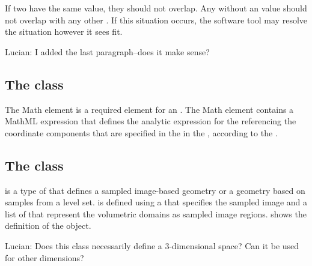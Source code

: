 If two \AnalyticVolumes have the same  value, they should not overlap.  Any \AnalyticVolume without an  value should not overlap with any other \AnalyticVolume.  If this situation occurs, the software tool may resolve the situation however it sees fit.

{\color{red} Lucian: \notice I added the last paragraph--does it make sense?}


\subsection{The  class}
\label{Math-class}
The Math element is a required element for an \AnalyticVolume. The Math element contains a MathML expression that defines the analytic expression for the \AnalyticVolume referencing the coordinate components that are specified in the \ListOfCoordinateComponents in the \Geometry, according to the . 


\subsection{The  class}
\label{SampledFieldGeometry-class}
\label{ListOfSampledVolumes-class}
\SampledFieldGeometry is a type of \GeometryDefinition that defines a sampled image-based geometry or a geometry based on samples from a level set. \SampledFieldGeometry is defined using a \SampledField that specifies the sampled image and a list of \SampledVolumes that represent the volumetric domains as sampled image regions.  shows the definition of the \SampledFieldGeometry object.

{\color{red} Lucian: \notice Does this class necessarily define a 3-dimensional space?  Can it be used for other dimensions?}


